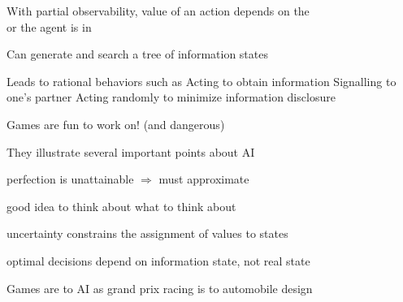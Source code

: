\documentclass{article}
\begin{document}
\begin{huge}
With partial observability, value of an action depends on the\\
 or  the agent is in

Can generate and search a tree of information states

Leads to rational behaviors such as\al
\blob Acting to obtain information\al
\blob Signalling to one's partner\al
\blob Acting randomly to minimize information disclosure




Games are fun to work on! (and dangerous)

They illustrate several important points about AI

\blob perfection is unattainable $\Rightarrow$ must approximate

\blob good idea to think about what to think about

\blob uncertainty constrains the assignment of values to states

\blob optimal decisions depend on information state, not real state

Games are to AI as grand prix racing is to automobile design



\end{huge}
\end{document}
